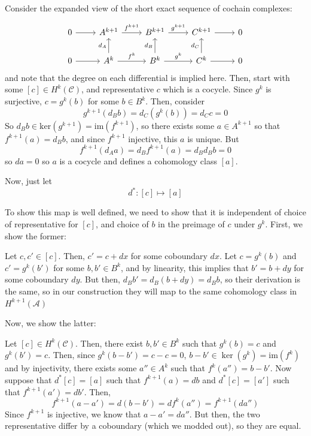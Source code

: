 \documentclass{article}
\begin{document}
\begin{customproof}
  \

  Consider the expanded view of the short exact sequence of cochain complexes:

  \[
    \begin{tikzcd}
      0 & A^{k+1} & B^{k+1} & C^{k+1} & 0\\
      0 & A^k & B^k & C^k & 0
      \arrow[from=1-1, to=1-2]
      \arrow[from=1-2, to=1-3, "f^{k+1}"]
      \arrow[from=1-3, to=1-4, "g^{k+1}"]
      \arrow[from=1-4, to=1-5]
      \arrow[from=2-1, to=2-2]
      \arrow[from=2-2, to=2-3, "f^{k}"]
      \arrow[from=2-3, to=2-4, "g^{k}"]
      \arrow[from=2-4, to=2-5]
      \arrow[from=2-2, to=1-2, "d_A"]
      \arrow[from=2-3, to=1-3, "d_B"]
      \arrow[from=2-4, to=1-4, "d_C"]
  \end{tikzcd}\]and note that the degree on each differential is implied here. Then, start with some $[c] \in H^k(\mathcal{C})$, and representative $c$ which is a cocycle. Since $g^k$ is surjective, $c = g^k(b)$ for some $b \in B^k$. Then, consider $$g^{k+1}(d_Bb) = d_C(g^k(b)) = d_Cc = 0$$So $d_Bb \in \text{ker}(g^{k+1}) = \text{im}(f^{k+1})$, so there exists some $a \in A^{k+1}$ so that $f^{k+1}(a) = d_Bb$, and since $f^{k+1}$ injective, this $a$ is unique. But $$f^{k+1}(d_A a) = d_Bf^{k+1}(a) = d_Bd_Bb = 0$$so $da = 0$ so $a$ is a cocycle and defines a cohomology class $[a]$.

  Now, just let $$d^*: [c] \mapsto [a]$$

  To show this map is well defined, we need to show that it is independent of choice of representative for $[c]$, and choice of $b$ in the preimage of $c$ under $g^k$. First, we show the former:

  Let $c, c' \in [c]$. Then, $c' = c + dx$ for some coboundary $dx$. Let $c = g^k(b)$ and $c' = g^k(b') $ for some $b, b' \in B^k$, and by linearity, this implies that $b' = b + dy$ for some coboundary $dy$. But then, $d_Bb' = d_B(b+dy) = d_Bb$, so their derivation is the same, so in our construction they will map to the same cohomology class in $H^{k+1}(\mathcal{A})$

  Now, we show the latter:

  Let $[c] \in H^k(\mathcal{C})$. Then, there exist $b, b' \in B^k$ such that $g^k(b) = c$ and $g^k(b') = c$. Then, since $g^k(b-b') = c-c = 0$, $b-b' \in \ker(g^k)= \text{im}(f^k)$ and by injectivity, there exists some $a'' \in A^k$ such that $f^k(a'') = b-b'$. Now suppose that $d^*[c] = [a]$ such that $f^{k+1}(a) = db$ and $d^*[c] = [a']$ such that $f^{k+1}(a') = db'$. Then, $$f^{k+1}(a-a') = d(b-b') = df^k(a'') = f^{k+1}(da'')$$Since $f^{k+1}$ is injective, we know that $a-a' = da''$. But then, the two representative differ by a coboundary (which we modded out), so they are equal.
\end{customproof}
\end{document}
